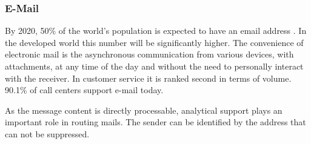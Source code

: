 		\subsubsection{E-Mail}
		
		By 2020, 50\% of the world's population is expected to have an email address \citep{radicati2016}. In the developed world this number will be significantly higher. The convenience of electronic mail is the asynchronous communication from various devices, with attachments, at any time of the day and without the need to personally interact with the receiver. In customer service it is ranked second in terms of volume. 90.1\% of call centers support e-mail \citep{dimensiondata2016} today. %
		
		As the message content is directly processable, analytical support plays an important role in routing mails. The sender can be identified by the address that can not be suppressed. 
